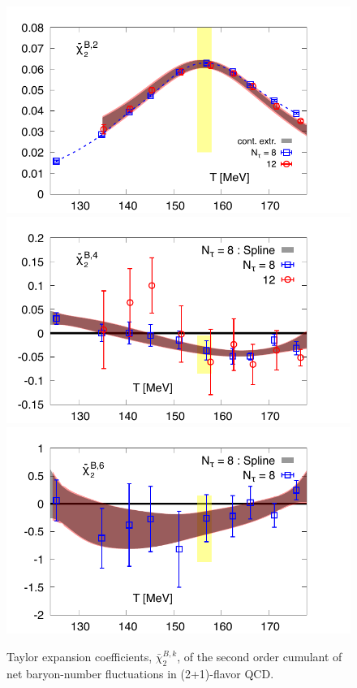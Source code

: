 \documentclass[pdflatex,prd,twocolumn,showpacs,superscriptaddress,nofootinbib]{revtex4-1}
\newcommand \cb {\bar{\chi}}
\begin{document}
\begin{figure}[t]
\includegraphics[scale=0.48]{fig/B4_r05.pdf}
\hspace*{-0.4cm}
\includegraphics[scale=0.48]{fig/B6_r05.pdf}
\hspace*{-0.4cm}
\includegraphics[scale=0.48]{fig/B8_r05.pdf}
\caption{Taylor expansion coefficients, $\cb_2^{B,k}$, of the second order 
cumulant of net baryon-number fluctuations in
(2+1)-flavor QCD. 
}
\label{fig:taylor8b}
\end{figure}
\end{document}
